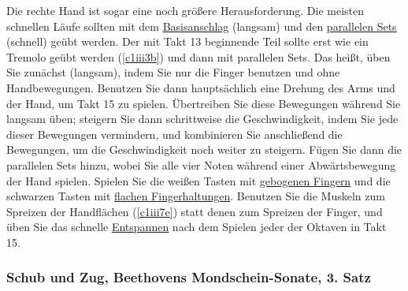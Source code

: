 Die rechte Hand ist sogar eine noch größere Herausforderung.
Die meisten schnellen Läufe sollten mit dem \hyperref[c1iii1a1]{Basisanschlag} (langsam) und den \hyperref[c1ii11]{parallelen Sets} (schnell) geübt werden.
Der mit Takt 13 beginnende Teil sollte erst wie ein Tremolo geübt werden (\hyperref[c1iii3b]{\autoref{c1iii3b}}) und dann mit parallelen Sets.
Das heißt, üben Sie zunächst (langsam), indem Sie nur die Finger benutzen und ohne Handbewegungen.
Benutzen Sie dann hauptsächlich eine Drehung des Arms und der Hand, um Takt 15 zu spielen.
Übertreiben Sie diese Bewegungen während Sie langsam üben; steigern Sie dann schrittweise die Geschwindigkeit, indem Sie jede dieser Bewegungen vermindern, und kombinieren Sie anschließend die Bewegungen, um die Geschwindigkeit noch weiter zu steigern.
Fügen Sie dann die parallelen Sets hinzu, wobei Sie alle vier Noten während einer Abwärtsbewegung der Hand spielen.
Spielen Sie die weißen Tasten mit \hyperref[c1ii2]{gebogenen Fingern} und die schwarzen Tasten mit \hyperref[c1iii4b]{flachen Fingerhaltungen}.
Benutzen Sie die Muskeln zum Spreizen der Handflächen (\hyperref[c1iii7e]{\autoref{c1iii7e}}) statt denen zum Spreizen der Finger, und üben Sie das schnelle \hyperref[c1ii14]{Entspannen} nach dem Spielen jeder der Oktaven in Takt 15.

\label{c1iii5f}
\subsubsection{Schub und Zug, Beethovens Mondschein-Sonate, 3. Satz}
\label{c1iii5SchubZug}

